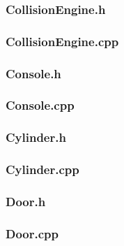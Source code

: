 \documentclass{article}
\begin{document}
\subsubsection{CollisionEngine.h}
	
					
\subsubsection{CollisionEngine.cpp}
	
					
\subsubsection{Console.h}
	
					
\subsubsection{Console.cpp}
	
					
\subsubsection{Cylinder.h}
	
					
\subsubsection{Cylinder.cpp}
	
					
\subsubsection{Door.h}
	

\subsubsection{Door.cpp}
	
 				
\end{document}
